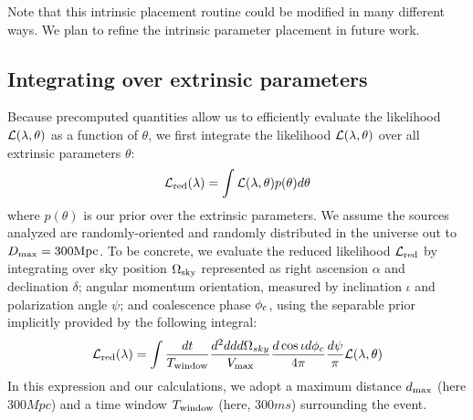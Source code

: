 Note that this intrinsic placement routine could be modified in many different ways. 
We plan to refine the intrinsic parameter placement in future work.





\subsection{Integrating over extrinsic parameters}
\label{subsec:extrinsic}

Because precomputed quantities allow us to efficiently evaluate the likelihood ${\cal L}(\lambda,\theta)$ as a function of
$\theta$, we first integrate the likelihood ${\cal L}(\lambda,\theta)$ over all extrinsic parameters $\theta$:
\begin{eqnarray}
{{\cal L}_{\rm red}}(\lambda) = \int {\cal L}(\lambda,\theta) p(\theta) d\theta
\end{eqnarray}
where $p(\theta)$ is our prior over the extrinsic  parameters.  We assume the sources analyzed are randomly-oriented and
randomly distributed in the universe out to $D_{\rm max}=300 {\rm Mpc}$.  
To be concrete, we evaluate the reduced likelihood ${{\cal L}_{\rm red}}$ by integrating over sky position $\Omega_{\rm sky}$ represented
as right ascension $\alpha$ and declination $\delta$; angular momentum orientation, measured by inclination $\iota$ and
polarization angle $\psi$;  and coalescence phase $\phi_{\rm c}$, using the separable prior implicitly provided by the
following integral:
\begin{eqnarray}
{{\cal L}_{\rm red}}(\lambda) = \int \frac{dt}{T_{\rm window}} \frac{d^2 dd d\Omega_{sky} }{V_{\rm max}} \frac{d \cos \iota d\phi_c}{4\pi} \frac{d\psi}{\pi} {\cal L}(\lambda,\theta)
\end{eqnarray}
%
In this expression and our calculations, we adopt a maximum distance $d_{\rm max}$ (here $300 \unit{Mpc}$) and a time window
$ T_{\rm window}$  (here, $300\unit{ms}$)  surrounding the event.  

